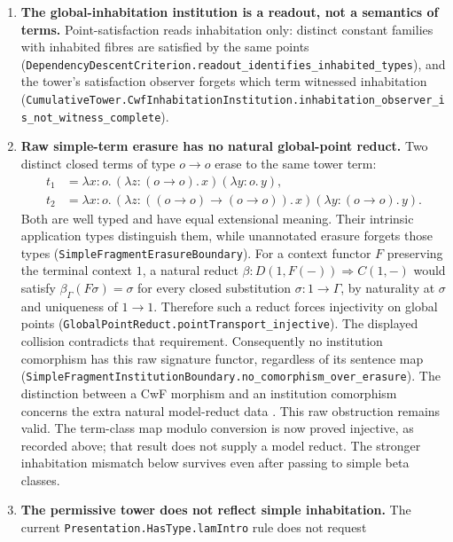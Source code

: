 \documentclass[11pt]{article}
\theoremstyle{definition}
\theoremstyle{remark}
\begin{document}
\begin{enumerate}
  (\nolinkurl{CwfSimpleDependentInstitution.varying_observation_not_in_simple_image},
  \nolinkurl{DependencyDescentCriterion.varying_outside_image}).
\item \textbf{The global-inhabitation institution is a readout, not a
  semantics of terms.}  Point-satisfaction reads inhabitation only: distinct
  constant families with inhabited fibres are satisfied by the same points
  (\nolinkurl{DependencyDescentCriterion.readout_identifies_inhabited_types}),
  and the tower's satisfaction observer forgets which term witnessed
  inhabitation
  (\nolinkurl{CumulativeTower.CwfInhabitationInstitution.inhabitation_observer_is_not_witness_complete}).
\item \textbf{Raw simple-term erasure has no natural global-point reduct.}
  Two distinct closed terms of type $o\to o$ erase to the same tower term:
  \[
  \begin{aligned}
  t_1 &= \lambda x:o.\,(\lambda z:(o\to o).\,x)(\lambda y:o.\,y),\\
  t_2 &= \lambda x:o.\,
    (\lambda z:((o\to o)\to(o\to o)).\,x)(\lambda y:(o\to o).\,y).
  \end{aligned}
  \]
  Both are well typed and have equal extensional meaning. Their intrinsic
  application types distinguish them, while unannotated erasure forgets those
  types (\nolinkurl{SimpleFragmentErasureBoundary}). For a context functor $F$
  preserving the terminal context $1$, a natural reduct
  $\beta:D(1,F(-))\Rightarrow C(1,-)$ would satisfy
  $\beta_\Gamma(F\sigma)=\sigma$ for every closed substitution
  $\sigma:1\to\Gamma$, by naturality at $\sigma$ and uniqueness of
  $1\to1$. Therefore such a reduct forces injectivity on global points
  (\nolinkurl{GlobalPointReduct.pointTransport_injective}). The displayed
  collision contradicts that requirement. Consequently no institution
  comorphism has this raw signature functor, regardless of its sentence map
  (\nolinkurl{SimpleFragmentInstitutionBoundary.no_comorphism_over_erasure}).
  The distinction between a CwF morphism and an institution comorphism concerns
  the extra natural model-reduct data \cite{GoguenRosuInstitutionMorphisms}.
  This raw obstruction remains valid. The term-class map modulo conversion
  is now proved injective, as recorded above; that result does not supply
  a model reduct. The stronger inhabitation mismatch below survives even
  after passing to simple beta classes.
\item \textbf{The permissive tower does not reflect simple inhabitation.}
  The current \nolinkurl{Presentation.HasType.lamIntro} rule does not request

\end{enumerate}
\end{document}
